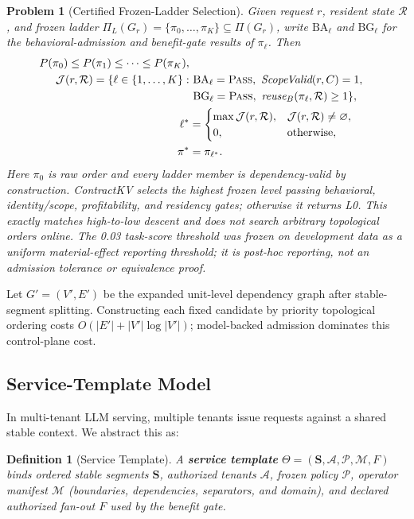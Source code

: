 \documentclass[journal]{IEEEtran}
\newtheorem{definition}{Definition}
\newtheorem{problem}{Problem}
\begin{document}
\begin{problem}[Certified Frozen-Ladder Selection]
\label{prob:dcpx}
Given request $r$, resident state $\mathcal{R}$, and frozen ladder $\Pi_L(G_r)=\{\pi_0,\ldots,\pi_K\}\subseteq\Pi(G_r)$, write $\mathrm{BA}_\ell$ and $\mathrm{BG}_\ell$ for the behavioral-admission and benefit-gate results of $\pi_\ell$. Then
{\scriptsize
\begin{align}
P(\pi_0)\le P(\pi_1)\le\cdots\le P(\pi_K), \label{eq:ladder_order}\\
\mathcal{J}(r,\mathcal{R})=\{\ell\in\{1,\ldots,K\}:&\ \mathrm{BA}_\ell=\textsc{Pass},\ \textit{ScopeValid}(r,C)=1,\notag\\
&\ \mathrm{BG}_\ell=\textsc{Pass},\ \textit{reuse}_B(\pi_\ell,\mathcal{R})\ge1\}, \label{eq:admissible_levels}\\
\ell^*&=\begin{cases}\max\mathcal{J}(r,\mathcal{R}),&\mathcal{J}(r,\mathcal{R})\ne\varnothing,\\0,&\text{otherwise},\end{cases} \label{eq:ladder_choice}\\
\pi^*&=\pi_{\ell^*}. \notag
\end{align}
}
Here $\pi_0$ is raw order and every ladder member is dependency-valid by construction. ContractKV selects the highest frozen level passing behavioral, identity/scope, profitability, and residency gates; otherwise it returns L0. This exactly matches high-to-low descent and does not search arbitrary topological orders online. The 0.03 task-score threshold was frozen on development data as a uniform material-effect reporting threshold; it is post-hoc reporting, not an admission tolerance or equivalence proof.
\end{problem}

\noindent Let $G'=(V',E')$ be the expanded unit-level dependency graph after stable-segment splitting. Constructing each fixed candidate by priority topological ordering costs $O(|E'|+|V'|\log|V'|)$; model-backed admission dominates this control-plane cost.

\subsection{Service-Template Model}

In multi-tenant LLM serving, multiple tenants issue requests against a shared stable context. We abstract this as:

\begin{definition}[Service Template]
A \textbf{service template} $\Theta=(\mathbf{S},\mathcal{A},\mathcal{P},\mathcal{M},F)$ binds ordered stable segments $\mathbf{S}$, authorized tenants $\mathcal{A}$, frozen policy $\mathcal{P}$, operator manifest $\mathcal{M}$ (boundaries, dependencies, separators, and domain), and declared authorized fan-out $F$ used by the benefit gate.
\end{definition}
\end{document}
